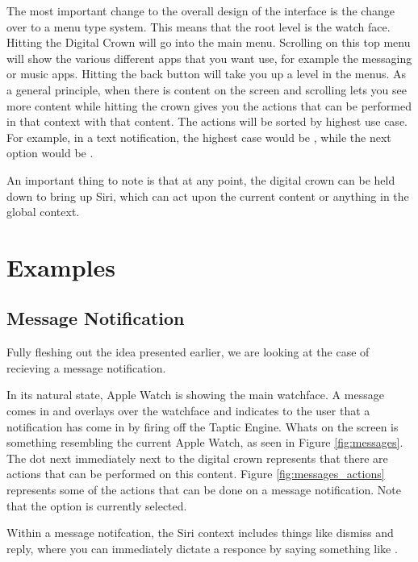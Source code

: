 \documentclass[journal,letterpaper]{article}
\begin{document}
    The most important change to the overall design of the interface is the change over to a menu type system. This means that the root level is the watch face. Hitting the Digital Crown will go into the main menu. Scrolling on this top menu will show the various different apps that you want use, for example the messaging or music apps. Hitting the back button will take you up a level in the menus. As a general principle, when there is content on the screen and scrolling lets you see more content while hitting the crown gives you the actions that can be performed in that context with that content. The actions will be sorted by highest use case. For example, in a text notification, the highest case would be , while the next option would be .

    An important thing to note is that at any point, the digital crown can be held down to bring up Siri, which can act upon the current content or anything in the global context.

    \section{Examples}
    \label{examples}

    \subsection{Message Notification}

    Fully fleshing out the idea presented earlier, we are looking at the case of recieving a message notification.

    In its natural state, Apple Watch is showing the main watchface. A message comes in and overlays over the watchface and indicates to the user that a notification has come in by firing off the Taptic Engine. Whats on the screen is something resembling the current Apple Watch, as seen in Figure \ref{fig:messages}. The dot next immediately next to the digital crown represents that there are actions that can be performed on this content. Figure \ref{fig:messages_actions} represents some of the actions that can be done on a message notification. Note that the  option is currently selected. 

    Within a message notifcation, the Siri context includes things like dismiss and reply, where you can immediately dictate a responce by saying something like .
\end{document}
